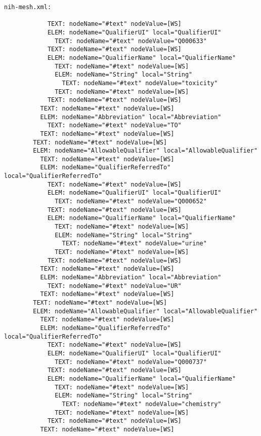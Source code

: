 \documentclass[11pt,english]{article}
\begin{document}
\begin{enumerate}
\begin{lstlisting}
nih-mesh.xml:

            TEXT: nodeName="#text" nodeValue=[WS]
            ELEM: nodeName="QualifierUI" local="QualifierUI"
              TEXT: nodeName="#text" nodeValue="Q000633"
            TEXT: nodeName="#text" nodeValue=[WS]
            ELEM: nodeName="QualifierName" local="QualifierName"
              TEXT: nodeName="#text" nodeValue=[WS]
              ELEM: nodeName="String" local="String"
                TEXT: nodeName="#text" nodeValue="toxicity"
              TEXT: nodeName="#text" nodeValue=[WS]
            TEXT: nodeName="#text" nodeValue=[WS]
          TEXT: nodeName="#text" nodeValue=[WS]
          ELEM: nodeName="Abbreviation" local="Abbreviation"
            TEXT: nodeName="#text" nodeValue="TO"
          TEXT: nodeName="#text" nodeValue=[WS]
        TEXT: nodeName="#text" nodeValue=[WS]
        ELEM: nodeName="AllowableQualifier" local="AllowableQualifier"
          TEXT: nodeName="#text" nodeValue=[WS]
          ELEM: nodeName="QualifierReferredTo" local="QualifierReferredTo"
            TEXT: nodeName="#text" nodeValue=[WS]
            ELEM: nodeName="QualifierUI" local="QualifierUI"
              TEXT: nodeName="#text" nodeValue="Q000652"
            TEXT: nodeName="#text" nodeValue=[WS]
            ELEM: nodeName="QualifierName" local="QualifierName"
              TEXT: nodeName="#text" nodeValue=[WS]
              ELEM: nodeName="String" local="String"
                TEXT: nodeName="#text" nodeValue="urine"
              TEXT: nodeName="#text" nodeValue=[WS]
            TEXT: nodeName="#text" nodeValue=[WS]
          TEXT: nodeName="#text" nodeValue=[WS]
          ELEM: nodeName="Abbreviation" local="Abbreviation"
            TEXT: nodeName="#text" nodeValue="UR"
          TEXT: nodeName="#text" nodeValue=[WS]
        TEXT: nodeName="#text" nodeValue=[WS]
        ELEM: nodeName="AllowableQualifier" local="AllowableQualifier"
          TEXT: nodeName="#text" nodeValue=[WS]
          ELEM: nodeName="QualifierReferredTo" local="QualifierReferredTo"
            TEXT: nodeName="#text" nodeValue=[WS]
            ELEM: nodeName="QualifierUI" local="QualifierUI"
              TEXT: nodeName="#text" nodeValue="Q000737"
            TEXT: nodeName="#text" nodeValue=[WS]
            ELEM: nodeName="QualifierName" local="QualifierName"
              TEXT: nodeName="#text" nodeValue=[WS]
              ELEM: nodeName="String" local="String"
                TEXT: nodeName="#text" nodeValue="chemistry"
              TEXT: nodeName="#text" nodeValue=[WS]
            TEXT: nodeName="#text" nodeValue=[WS]
          TEXT: nodeName="#text" nodeValue=[WS]

\end{lstlisting}
\end{enumerate}
\end{document}
